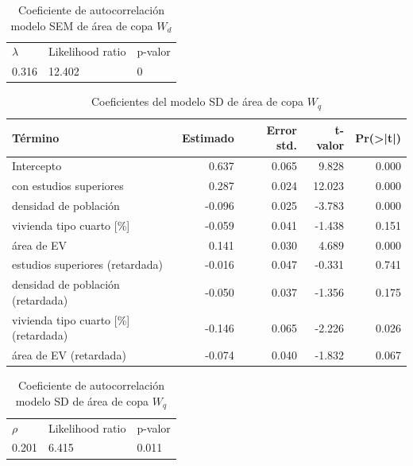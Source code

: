 \documentclass[12pt,a4paper,openany]{book}
\theoremstyle{definition}
\theoremstyle{definition}
\theoremstyle{definition}
\theoremstyle{remark}
\begin{document}
\begin{table}[H]

\caption{\label{tab:cauto-sem-copa}Coeficiente de autocorrelación modelo SEM de área de copa $W_d$}
\centering
\begin{tabular}{lll}
\toprule
$\lambda$ & Likelihood ratio & p-valor\\
0.316 & 12.402 & 0\\
\bottomrule
\end{tabular}
\end{table}

\begin{table}[H]

\caption{\label{tab:coef-sd-copa-wq}Coeficientes del modelo SD de área de copa $W_q$}
\centering
\begin{tabular}{lrrrr}
\toprule
Término & Estimado & Error std. & t-valor & Pr(>|t|)\\
\midrule
Intercepto & 0.637 & 0.065 & 9.828 & 0.000\\
con estudios superiores & 0.287 & 0.024 & 12.023 & 0.000\\
densidad de población & -0.096 & 0.025 & -3.783 & 0.000\\
vivienda tipo cuarto [\%] & -0.059 & 0.041 & -1.438 & 0.151\\
área de EV & 0.141 & 0.030 & 4.689 & 0.000\\
\addlinespace
estudios superiores (retardada) & -0.016 & 0.047 & -0.331 & 0.741\\
densidad de población (retardada) & -0.050 & 0.037 & -1.356 & 0.175\\
vivienda tipo cuarto [\%] (retardada) & -0.146 & 0.065 & -2.226 & 0.026\\
área de EV (retardada) & -0.074 & 0.040 & -1.832 & 0.067\\
\bottomrule
\end{tabular}
\end{table}

\begin{table}[H]

\caption{\label{tab:cauto-sd-copa-wq}Coeficiente de autocorrelación modelo SD de área de copa $W_q$}
\centering
\begin{tabular}{lll}
\toprule
$\rho$ & Likelihood ratio & p-valor\\
0.201 & 6.415 & 0.011\\
\bottomrule
\end{tabular}
\end{table}
\end{document}
